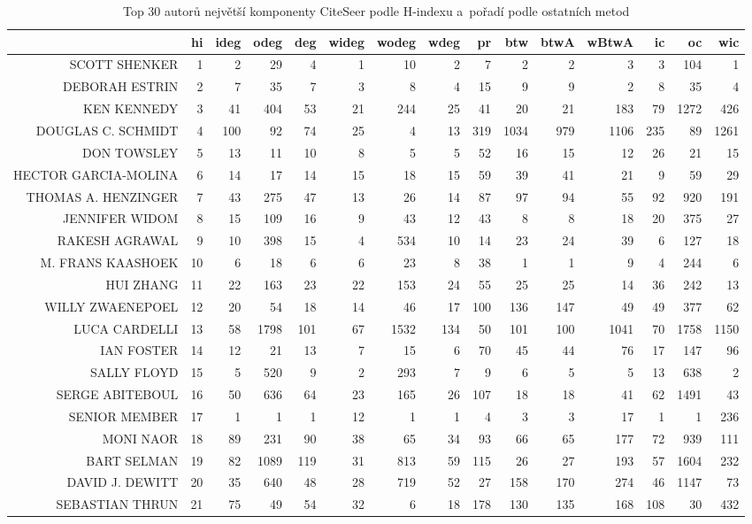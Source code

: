 \documentclass{bakalarka}
\begin{document}
\begin{table}[!ht]
\centering
\caption{Top 30 autorů největší komponenty CiteSeer podle H-indexu a~pořadí podle ostatních metod}
\label{tab:ranks4}
\begin{sideways}
\begin{scriptsize}
\begin{tabular}{r|r|rrrrrrrrrrrrr}
\toprule
&hi&ideg&odeg&deg&wideg&wodeg&wdeg&pr&btw&btwA&wBtwA&ic&oc&wic\\
\midrule
SCOTT SHENKER&1&2&29&4&1&10&2&7&2&2&3&3&104&1\\
DEBORAH ESTRIN&2&7&35&7&3&8&4&15&9&9&2&8&35&4\\
KEN KENNEDY&3&41&404&53&21&244&25&41&20&21&183&79&1272&426\\
DOUGLAS C. SCHMIDT&4&100&92&74&25&4&13&319&1034&979&1106&235&89&1261\\
DON TOWSLEY&5&13&11&10&8&5&5&52&16&15&12&26&21&15\\
HECTOR GARCIA-MOLINA&6&14&17&14&15&18&15&59&39&41&21&9&59&29\\
THOMAS A. HENZINGER&7&43&275&47&13&26&14&87&97&94&55&92&920&191\\
JENNIFER WIDOM&8&15&109&16&9&43&12&43&8&8&18&20&375&27\\
RAKESH AGRAWAL&9&10&398&15&4&534&10&14&23&24&39&6&127&18\\
M. FRANS KAASHOEK&10&6&18&6&6&23&8&38&1&1&9&4&244&6\\
HUI ZHANG&11&22&163&23&22&153&24&55&25&25&14&36&242&13\\
WILLY ZWAENEPOEL&12&20&54&18&14&46&17&100&136&147&49&49&377&62\\
LUCA CARDELLI&13&58&1798&101&67&1532&134&50&101&100&1041&70&1758&1150\\
IAN FOSTER&14&12&21&13&7&15&6&70&45&44&76&17&147&96\\
SALLY FLOYD&15&5&520&9&2&293&7&9&6&5&5&13&638&2\\
SERGE ABITEBOUL&16&50&636&64&23&165&26&107&18&18&41&62&1491&43\\
SENIOR MEMBER&17&1&1&1&12&1&1&4&3&3&17&1&1&236\\
MONI NAOR&18&89&231&90&38&65&34&93&66&65&177&72&939&111\\
BART SELMAN&19&82&1089&119&31&813&59&115&26&27&193&57&1604&232\\
DAVID J. DEWITT&20&35&640&48&28&719&52&27&158&170&274&46&1147&73\\
SEBASTIAN THRUN&21&75&49&54&32&6&18&178&130&135&168&108&30&432\\

\end{tabular}
\end{scriptsize}
\end{sideways}
\end{table}
\end{document}
